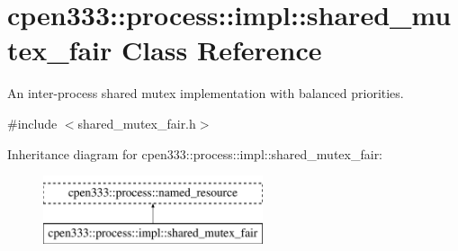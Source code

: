 \hypertarget{classcpen333_1_1process_1_1impl_1_1shared__mutex__fair}{}\section{cpen333\+:\+:process\+:\+:impl\+:\+:shared\+\_\+mutex\+\_\+fair Class Reference}
\label{classcpen333_1_1process_1_1impl_1_1shared__mutex__fair}


An inter-\/process shared mutex implementation with balanced priorities.  




{\ttfamily \#include $<$shared\+\_\+mutex\+\_\+fair.\+h$>$}

Inheritance diagram for cpen333\+:\+:process\+:\+:impl\+:\+:shared\+\_\+mutex\+\_\+fair\+:\begin{figure}[H]
\begin{center}
\leavevmode
\includegraphics[height=2.000000cm]{classcpen333_1_1process_1_1impl_1_1shared__mutex__fair}
\end{center}
\end{figure}
